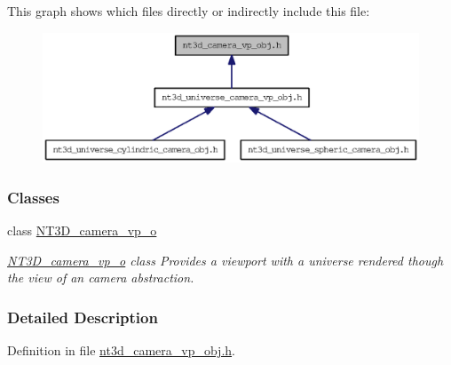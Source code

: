 This graph shows which files directly or indirectly include this file:
\nopagebreak
\begin{figure}[H]
\begin{center}
\leavevmode
\includegraphics[width=400pt]{nt3d__camera__vp__obj_8h__dep__incl}
\end{center}
\end{figure}
\subsubsection*{Classes}
\begin{DoxyCompactItemize}
\item 
class \hyperlink{class_n_t3_d__camera__vp__o}{NT3D\_\-camera\_\-vp\_\-o}
\begin{DoxyCompactList}\small\item\em \hyperlink{class_n_t3_d__camera__vp__o}{NT3D\_\-camera\_\-vp\_\-o} class Provides a viewport with a universe rendered though the view of an camera abstraction. \item\end{DoxyCompactList}\end{DoxyCompactItemize}


\subsubsection{Detailed Description}


Definition in file \hyperlink{nt3d__camera__vp__obj_8h_source}{nt3d\_\-camera\_\-vp\_\-obj.h}.

